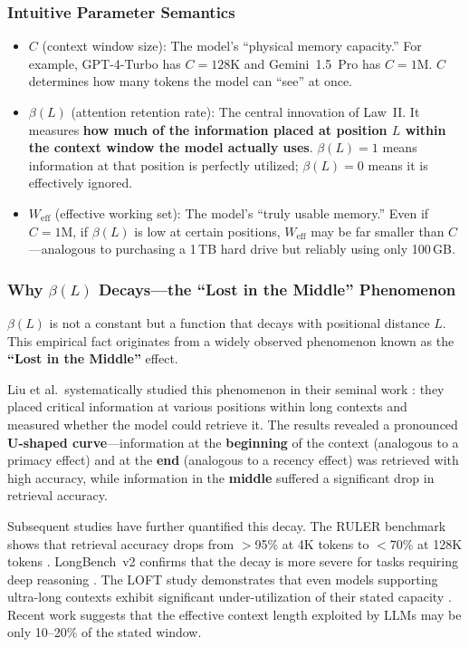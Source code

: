 \documentclass[11pt,a4paper]{article}
\begin{document}
\subsubsection{Intuitive Parameter Semantics}

\begin{itemize}[nosep]
\item $C$ (context window size): The model's ``physical memory capacity.'' For example, GPT-4-Turbo has $C = 128\mathrm{K}$ and Gemini~1.5~Pro has $C = 1\mathrm{M}$. $C$ determines how many tokens the model can ``see'' at once.

\item $\beta(L)$ (attention retention rate): The central innovation of Law~II. It measures \textbf{how much of the information placed at position $L$ within the context window the model actually uses}. $\beta(L) = 1$ means information at that position is perfectly utilized; $\beta(L) = 0$ means it is effectively ignored.

\item $W_{\mathrm{eff}}$ (effective working set): The model's ``truly usable memory.'' Even if $C = 1\mathrm{M}$, if $\beta(L)$ is low at certain positions, $W_{\mathrm{eff}}$ may be far smaller than $C$---analogous to purchasing a 1\,TB hard drive but reliably using only 100\,GB.
\end{itemize}

\subsubsection{Why $\beta(L)$ Decays---the ``Lost in the Middle'' Phenomenon}

$\beta(L)$ is not a constant but a function that decays with positional distance $L$. This empirical fact originates from a widely observed phenomenon known as the \textbf{``Lost in the Middle''} effect.

Liu et al.\ systematically studied this phenomenon in their seminal work \cite{liu2023lostmiddle}: they placed critical information at various positions within long contexts and measured whether the model could retrieve it. The results revealed a pronounced \textbf{U-shaped curve}---information at the \textbf{beginning} of the context (analogous to a primacy effect) and at the \textbf{end} (analogous to a recency effect) was retrieved with high accuracy, while information in the \textbf{middle} suffered a significant drop in retrieval accuracy.

Subsequent studies have further quantified this decay. The RULER benchmark shows that retrieval accuracy drops from $>$95\% at 4K tokens to $<$70\% at 128K tokens \cite{ruler2024}. LongBench~v2 confirms that the decay is more severe for tasks requiring deep reasoning \cite{longbenchv2_2024}. The LOFT study demonstrates that even models supporting ultra-long contexts exhibit significant under-utilization of their stated capacity \cite{loft2024}. Recent work suggests that the effective context length exploited by LLMs may be only 10--20\% of the stated window.
\end{document}

